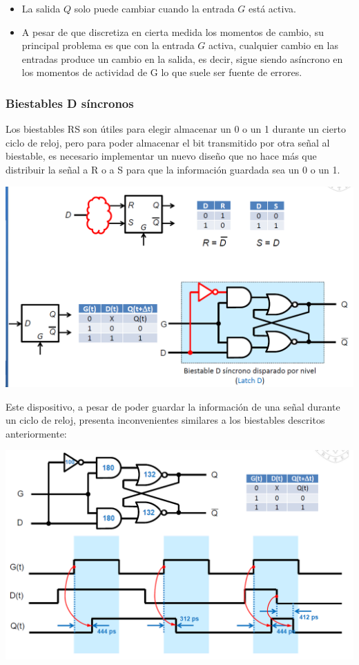 \documentclass[a4paper,10pt]{book}
\begin{document}
\begin{itemize}
\item La salida $Q$ solo puede cambiar cuando la entrada $G$ está activa.
\item A pesar de que discretiza en cierta medida los momentos de cambio, su principal problema es que con la entrada $G$ activa, cualquier cambio en las entradas produce un cambio en la salida, es decir, sigue siendo asíncrono en los momentos de actividad de G lo que suele ser fuente de errores.
\end{itemize}

\subsubsection*{Biestables D síncronos}
Los biestables RS son útiles para elegir almacenar un 0 o un 1 durante un cierto ciclo de reloj, pero para poder almacenar el bit transmitido por otra señal al biestable, es necesario implementar un nuevo diseño que no hace más que distribuir la señal a R o a S para que la información guardada sea un 0 o un 1.

\begin{center}
\includegraphics[scale=0.5]{biestable D por nivel}
\end{center}

Este dispositivo, a pesar de poder guardar la información de una señal durante un ciclo de reloj, presenta inconvenientes similares a los biestables descritos anteriormente:

\begin{center}
\includegraphics[scale=0.5]{cronograma biestable D por nivel}
\end{center}
\end{document}
